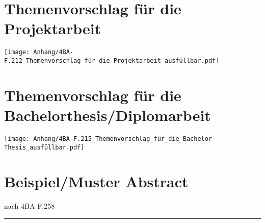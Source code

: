 \chapter{Themenvorschlag für die Projektarbeit}
\label{anhang-themenvorschlag-projekt}
\texttt{[image: Anhang/4BA-F.212\_Themenvorschlag\_für\_die\_Projektarbeit\_ausfüllbar.pdf]}
\clearpage

\chapter{Themenvorschlag für die Bachelorthesis/Diplomarbeit}
\label{anhang-themenvorschlag-bt-dipl}
\texttt{[image: Anhang/4BA-F.215\_Themenvorschlag\_für\_die\_Bachelor-Thesis\_ausfüllbar.pdf]}
\clearpage
{}


\clearpage


\clearpage

\chapter{Beispiel/Muster Abstract}
\label{anhang-abstract}
\begin{minipage}{0.5\columnwidth}
    
\end{minipage}
\begin{minipage}{0.45\columnwidth}
    \begin{flushright}
        {\small nach 4BA-F.258\\}
    \end{flushright}
\end{minipage}
\par\noindent\rule{\columnwidth}{.5pt}

